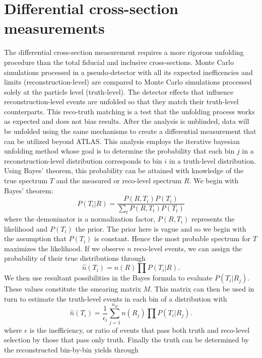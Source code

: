 \section{Differential cross-section measurements}
The differential cross-section measurement requires a more rigorous unfolding procedure than the total fiducial and inclusive cross-sections. Monte Carlo simulations processed in a pseudo-detector with all its expected inefficencies and limits (reconstruction-level) are compared to Monte Carlo simulations processed solely at the particle level (truth-level). The detector effects that influence reconstruction-level events are unfolded so that they match their truth-level counterparts. This reco-truth matching is a test that the unfolding process works as expected and does not bias results. After the analysis is unblinded, data will be unfolded using the same mechanisms to create a differential measurement that can be utilized beyond ATLAS. This analysis employs the iterative bayesian unfolding method\cite{bayesian} whose goal is to determine the probability that each bin $j$ in a reconstruction-level distribution corresponds to bin $i$ in a truth-level distribution. Using Bayes' theorem, this probability can be attained with knowledge of the true spectrum $T$ and the measured or reco-level spectrum $R$. We begin with Bayes' theorem: 
\begin{equation}
P(T_i|R)=\frac{P(R,T_i)P(T_i)}{\sum_{t} P(R,T_t)P(T_t)}
\end{equation}
where the demoninator is a normalization factor, $P(R,T_i)$ represents the likelihood and $P(T_i)$ the prior. The prior here is vague and so we begin with the assumption that $P(T_i)$ is constant. Hence the most probable spectrum for $T$ maximizes the likelihood. If we observe $n$ reco-level events, we can assign the probability of their true distributions through
\begin{equation}
\hat{n}(T_i)=n(R)\prod P(T_i|R).
\end{equation}
We then use resultant possibilities in the Bayes formula to evaluate $P(T_i|R_j)$. These values constitute the smearing matrix $M$. This matrix can then be used in turn to estimate the truth-level events in each bin of a distribution with
\begin{equation}
\hat{n}(T_i)=\frac{1}{\epsilon_i}\sum_{j=1}^{n_R} n(R_j)\prod P(T_i|R_j).
\end{equation}
where $\epsilon$ is the inefficiency, or ratio of events that pass both truth and reco-level selection by those that pass only truth. Finally the truth can be determined by the reconstructed bin-by-bin yields through
